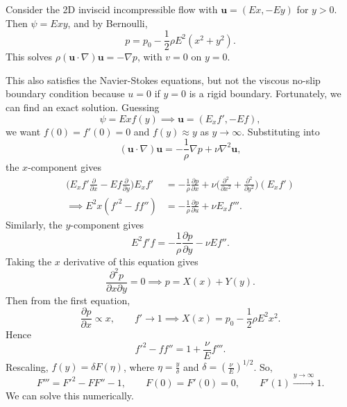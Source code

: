 \documentclass[12pt]{article}
\begin{document}
Consider the 2D inviscid incompressible flow with $\mathbf{u} = (Ex, -Ey)$ for $y > 0$. Then $\psi = Exy$, and by Bernoulli,
\[
p = p_0 - \frac{1}{2} \rho E^2(x^2 + y^2)
.\]
This solves $\rho (\mathbf{u} \cdot \nabla)\mathbf{u} = - \nabla p$, with $v = 0$ on $y = 0$.

This also satisfies the Navier-Stokes equations, but not the viscous no-slip boundary condition because $u = 0$ if $y = 0$ is a rigid boundary. Fortunately, we can find an exact solution. Guessing
\[
\psi = Ex f(y) \implies \mathbf{u} = (E_x f', -Ef)
,\]
we want $f(0) = f'(0) = 0$ and $f(y) \approx y$ as $y \to \infty$. Substituting into
\[
	(\mathbf{u} \cdot \nabla)\mathbf{u} = - \frac{1}{\rho} \nabla p + \nu \nabla^2 \mathbf{u}
,\]
the $x$-component gives
\begin{align*}
	\biggl(E_x f' \frac{\partial}{\partial x} - E f \frac{\partial}{\partial y}\biggr) E_x f' &= - \frac{1}{\rho} \frac{\partial p}{\partial x} + \nu \biggl( \frac{\partial^2}{\partial x^2} + \frac{\partial^2}{\partial y^2} \biggr) (E_x f') \\
	\implies E^2 x(f'^2 - ff'') &= - \frac{1}{\rho} \frac{\partial p}{\partial u} + \nu E_x f'''.
\end{align*}
Similarly, the $y$-component gives
\[
	E^2 f' f = - \frac{1}{\rho} \frac{\partial p}{\partial y} - \nu E f''
.\]
Taking the $x$ derivative of this equation gives
\[
\frac{\partial^2 p}{\partial x \partial y} = 0 \implies p = X(x) + Y(y)
.\]
Then from the first equation,
\[
\frac{\partial p}{\partial x} \propto x, \qquad f' \to 1 \implies X(x) = p_0 - \frac{1}{2} \rho E^2 x^2
.\]
Hence
\[
f'^2 - ff'' = 1 + \frac{\nu}{E} f'''
.\]
Rescaling, $f(y) = \delta F(\eta)$, where $\eta = \frac{y}{\delta}$ and $\delta = (\frac{\nu}{E})^{1/2}$. So,
\[
	F''' = F'^2 - FF'' - 1, \qquad F(0) = F'(0) = 0, \qquad F'(1) \overset{y \to \infty}{\to} 1
.\]
We can solve this numerically.

\newpage

\printindex
\end{document}
